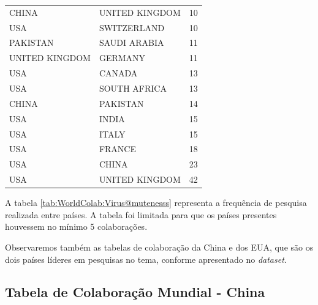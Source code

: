 \begin{table}[htp]
\begin{tabular}{|l|l|l|}
CHINA          & UNITED KINGDOM & 10        \\
USA            & SWITZERLAND    & 10        \\
PAKISTAN       & SAUDI ARABIA   & 11        \\
UNITED KINGDOM & GERMANY        & 11        \\
USA            & CANADA         & 13        \\
USA            & SOUTH AFRICA   & 13        \\
CHINA          & PAKISTAN       & 14        \\
USA            & INDIA          & 15        \\
USA            & ITALY          & 15        \\
USA            & FRANCE         & 18        \\
USA            & CHINA          & 23        \\
USA            & UNITED KINGDOM & 42        \\ \hline
\end{tabular}
\end{table}\label{tab:WorldColab:Virus@mutenesss}

A tabela \ref{tab:WorldColab:Virus@mutenesss} representa a frequência de pesquisa realizada entre países. A tabela foi limitada para que os países presentes houvessem no mínimo 5 colaborações.

Observaremos também as tabelas de colaboração da China e dos EUA, que são os dois países líderes em pesquisas no tema, conforme apresentado no \textit{dataset}.

\subsection{Tabela de Colaboração Mundial - China}

